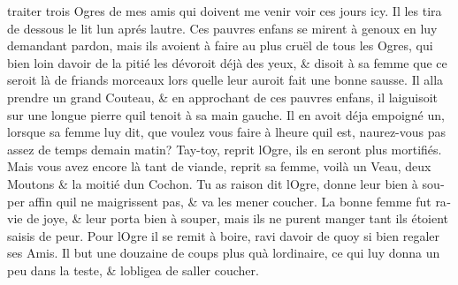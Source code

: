 \documentclass[14pt,a4paper]{memoir}
\begin{document}
{{\begin{otherlanguage}{french}
traiter trois Ogres de mes amis qui doivent me venir voir ces jours icy.
Il les tira de dessous le lit l\textquotesingle un aprés
l\textquotesingle autre. Ces pauvres enfans se mirent à genoux en luy
demandant pardon, mais ils avoient à faire au plus cruël de tous les
Ogres, qui bien loin d\textquotesingle avoir de la pitié les dévoroit
déjà des yeux, \& disoit à sa femme que ce seroit là de friands morceaux
lors qu\textquotesingle elle leur auroit fait une bonne sausse. Il alla
prendre un grand Couteau, \& en approchant de ces pauvres enfans, il
l\textquotesingle aiguisoit sur une longue pierre qu\textquotesingle il
tenoit à sa main gauche. Il en avoit déja empoigné un, lorsque sa femme
luy dit, que voulez vous faire à l\textquotesingle heure
qu\textquotesingle il est, n\textquotesingle aurez-vous pas assez de
temps demain matin? Tay-toy, reprit l\textquotesingle Ogre, ils en
seront plus mortifiés. Mais vous avez encore là tant de viande, reprit
sa femme, voilà un Veau, deux Moutons \& la moitié d\textquotesingle un
Cochon. Tu as raison dit l\textquotesingle Ogre, donne leur bien à
souper affin qu\textquotesingle il ne maigrissent pas, \& va les mener
coucher. La bonne femme fut ravie de joye, \& leur porta bien à souper,
mais ils ne purent manger tant ils étoient saisis de peur. Pour
l\textquotesingle Ogre il se remit à boire, ravi d\textquotesingle avoir
de quoy si bien regaler ses Amis. Il but une douzaine de coups plus
qu\textquotesingle à l\textquotesingle ordinaire, ce qui luy donna un
peu dans la teste, \& l\textquotesingle obligea de
s\textquotesingle aller coucher.


\end{otherlanguage}}}
\end{document}
